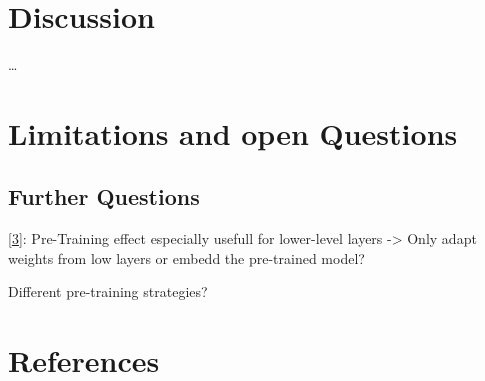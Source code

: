 \documentclass[
  11pt,
]{article}
\begin{document}
\hypertarget{discussion}{%
\section{Discussion}\label{discussion}}

\ldots{}

\hypertarget{limitations-and-open-questions}{%
\section{Limitations and open
Questions}\label{limitations-and-open-questions}}

\hypertarget{further-questions}{%
\subsection{Further Questions}\label{further-questions}}

{[}\protect\hyperlink{ref-pmlr-v5-erhan09a}{3}{]}: Pre-Training effect
especially usefull for lower-level layers -\textgreater{} Only adapt
weights from low layers or embedd the pre-trained model?

Different pre-training strategies?

\newpage

\hypertarget{I}{%
\section*{References}\label{I}}
\end{document}
